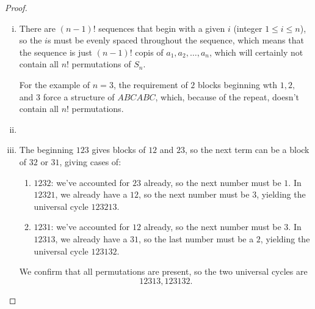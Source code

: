 \documentclass[11pt]{article}
\begin{document}
\begin{proof}
    \begin{enumerate}[(i)]
        \item There are $(n-1)!$ sequences that begin with a given $i$ (integer $1\leq i\leq n$), so the $i$s must be evenly spaced throughout the sequence, which means that the sequence is just $(n-1)!$ copis of $a_1,a_2,\dots,a_n$, which will certainly not contain all $n!$ permutations of $S_n$.
        
        For the example of $n=3$, the requirement of $2$ blocks beginning wth $1,2,$ and $3$ force a structure of $ABCABC$, which, because of the repeat, doesn't contain all $n!$ permutations. 
        \item %
        \item The beginning $123$ gives blocks of $12$ and $23$, so the next term can be a block of $32$ or $31$, giving cases of:
        \begin{enumerate}
            \item $1232$: we've accounted for $23$ already, so the next number must be $1$. In $12321$, we already have a $12$, so the next number must be $3$, yielding the universal cycle $123213$.
            \item $1231$: we've accounted for $12$ already, so the next number must be $3$. In $12313$, we already have a $31$, so the last number must be a $2$, yielding the universal cycle $123132$.
        \end{enumerate}
        We confirm that all permutations are present, so the two universal cycles are \[\boxed{12313,123132}.\]
    \end{enumerate}
\end{proof}
\end{document}
